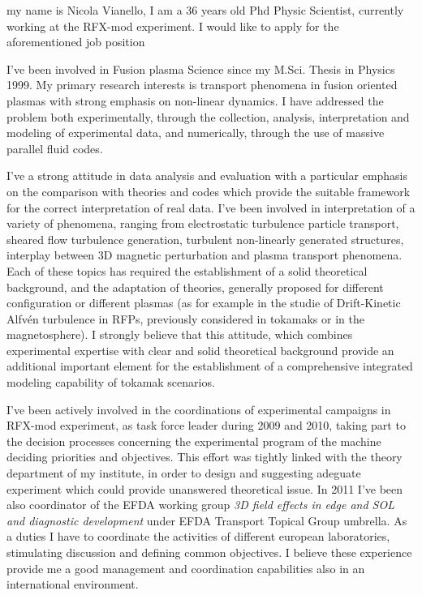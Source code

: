 \documentclass[12pt,stdletter,a4paper,dateno,sigleft]{newlfm}
\begin{document}
\begin{newlfm}
my name is Nicola Vianello, I am a 36 years old Phd Physic Scientist,
currently working at the RFX-mod experiment. I would like to apply for
the aforementioned job position

I've been involved in Fusion plasma Science since my M.Sci. Thesis in
Physics 1999. My primary research interests is transport phenomena in fusion
oriented plasmas with strong emphasis on non-linear dynamics. I have
addressed the problem both experimentally, through the collection, 
analysis, interpretation and modeling of experimental data, and
numerically, through the use of massive parallel fluid codes. 

I've a strong attitude in
data analysis and evaluation with a particular emphasis on the
comparison with theories and codes which provide the suitable framework for the
correct interpretation of real data. I've been involved in
interpretation of a variety of phenomena, ranging from electrostatic
turbulence particle transport, sheared flow turbulence generation,
turbulent non-linearly generated structures, interplay between 3D
magnetic perturbation and plasma transport phenomena. Each of these
topics has required the establishment of a solid theoretical
background, and the adaptation of theories, generally proposed for
different configuration or different plasmas (as for example in the
studie of Drift-Kinetic Alfv\'en turbulence in RFPs, previously
considered in tokamaks or in the magnetosphere). I strongly believe that this
attitude, which combines experimental expertise  with clear and solid
theoretical background provide an additional important element for the
establishment of a comprehensive integrated modeling capability of
tokamak scenarios. 

I've been actively involved in the coordinations of experimental
campaigns in RFX-mod experiment, as task force leader during 2009 and
2010, taking part to the decision processes concerning the
experimental program of the machine deciding priorities and
objectives. This effort was tightly linked with the theory department
of my institute, in order to design and suggesting adeguate experiment
which could provide unanswered theoretical issue.
In 2011 I've been also coordinator of the 
EFDA working group \emph{3D field effects in
  edge and SOL and diagnostic development} under EFDA Transport
Topical Group umbrella. As a duties I have to coordinate the
activities of different  european laboratories, stimulating
discussion and defining common objectives. I believe these experience
provide me a good management and coordination capabilities also in an
international environment. 


\end{newlfm}
\end{document}
